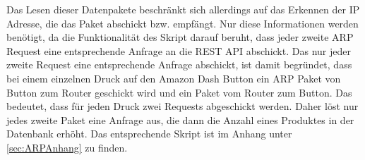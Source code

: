 Das Lesen dieser Datenpakete beschränkt sich allerdings auf das Erkennen der \ac{IP} Adresse, die das Paket abschickt bzw. empfängt. Nur diese Informationen werden benötigt, da die Funktionalität des Skript darauf beruht, dass jeder zweite \ac{ARP} Request eine entsprechende Anfrage an die \ac{REST} \ac{API} abschickt. Das nur jeder zweite Request eine entsprechende Anfrage abschickt, ist damit begründet, dass bei einem einzelnen Druck auf den Amazon Dash Button ein \ac{ARP} Paket von Button zum Router geschickt wird und ein Paket vom Router zum Button. Das bedeutet, dass für jeden Druck zwei Requests abgeschickt werden. Daher löst nur jedes zweite Paket eine Anfrage aus, die dann die Anzahl eines Produktes in der Datenbank erhöht. 
Das entsprechende Skript ist im Anhang unter \ref{sec:ARPAnhang} zu finden.